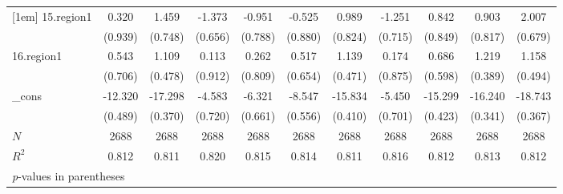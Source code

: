 \begin{tabular}{l*{10}{c}}
[1em]
15.region1  &       0.320&       1.459&      -1.373&      -0.951&      -0.525&       0.989&      -1.251&       0.842&       0.903&       2.007\\
            &     (0.939)&     (0.748)&     (0.656)&     (0.788)&     (0.880)&     (0.824)&     (0.715)&     (0.849)&     (0.817)&     (0.679)\\
[1em]
16.region1  &       0.543&       1.109&       0.113&       0.262&       0.517&       1.139&       0.174&       0.686&       1.219&       1.158\\
            &     (0.706)&     (0.478)&     (0.912)&     (0.809)&     (0.654)&     (0.471)&     (0.875)&     (0.598)&     (0.389)&     (0.494)\\
[1em]
\_cons      &     -12.320&     -17.298&      -4.583&      -6.321&      -8.547&     -15.834&      -5.450&     -15.299&     -16.240&     -18.743\\
            &     (0.489)&     (0.370)&     (0.720)&     (0.661)&     (0.556)&     (0.410)&     (0.701)&     (0.423)&     (0.341)&     (0.367)\\
\hline
\(N\)       &        2688&        2688&        2688&        2688&        2688&        2688&        2688&        2688&        2688&        2688\\
\(R^{2}\)   &       0.812&       0.811&       0.820&       0.815&       0.814&       0.811&       0.816&       0.812&       0.813&       0.812\\
\hline\hline
\multicolumn{11}{l}{\footnotesize \textit{p}-values in parentheses}\\
\end{tabular}
